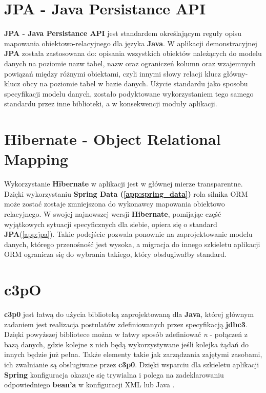 \section{JPA - Java Persistance API}\label{tech:jpa}
	\textbf{JPA - Java Persistance API} jest standardem określającym reguły opisu mapowania obiektowo-relacyjnego dla języka \textbf{Java}. W aplikacji demonstracyjnej \textbf{JPA} została zastosowana do: opisania wszystkich obiektów należących do modelu danych na poziomie nazw tabel, nazw oraz ograniczeń kolumn oraz wzajemnych powiązań między różnymi obiektami, czyli innymi słowy relacji klucz główny-klucz obcy na poziomie tabel w bazie danych. Użycie standardu jako sposobu specyfikacji modelu danych, zostało podyktowane wykorzystaniem tego samego standardu przez inne biblioteki, a w konsekwencji moduły aplikacji. 
	
\section{Hibernate - Object Relational Mapping}\label{tech:hibernate}
	Wykorzystanie \textbf{Hibernate} w aplikacji jest w głównej mierze transparentne. Dzięki wykorzystaniu \textbf{Spring Data (\ref{app:spring_data})} rola silnika ORM może zostać zostaje zmniejszona do wykonawcy mapowania obiektowo relacyjnego. W swojej najnowszej wersji \textbf{Hibernate}, pomijając część wyjątkowych sytuacji specyficznych dla siebie, opiera się o standard \textbf{JPA}(\ref{app:jpa}). Takie podejście pozwala ponownie na zaprojektowanie modelu danych, którego przenośność jest wysoka, a migracja do innego szkieletu aplikacji ORM ogranicza się do wybrania takiego, który obsługiwałby standard. 

\section{c3pO}
	\textbf{c3p0} jest łatwą do użycia biblioteką zaprojektowaną dla \textbf{Java}, której głównym zadaniem jest realizacja postulatów zdefiniowanych przez specyfikacją \textbf{jdbc3}. Dzięki powyższej bibliotece można w łatwy sposób zdefiniować \emph{n} - połączeń z bazą danych, gdzie kolejne z nich będą wykorzystywane jeśli kolejka żądań do innych będzie już pełna. Także elementy takie jak zarządzania zajętymi zasobami, ich zwalnianie są obsługiwane przez \textbf{c3p0}. Dzięki wsparciu dla szkieletu aplikacji \textbf{Spring} konfiguracja okazuje się trywialna i polega na zadeklarowaniu
	odpowiedniego \textbf{bean'a} w konfiguracji XML lub Java \cite{c3p0}.
	

